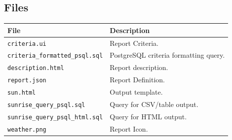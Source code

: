 \documentclass[a4paper,10pt]{book}
\newcommand{\partnumber}{\ifthenelse{\isundefined{\projectnum}}{}{\projectnum-\docnum	\ifthenelse{\equal{\docrev}{001}}{}{.\docrev}}}
\newcommand*\cleartoleftpage{%
  \clearpage
  \ifodd\value{page}\hbox{}\newpage\fi
}
\begin{document}
\subsection{Files}
\begin{tabular}{p{5.8cm} l}
\hline
\textbf{File} & \textbf{Description} \\
\hline
\verb|criteria.ui| & Report Criteria.\\
\verb|criteria_formatted_psql.sql| & PostgreSQL criteria formatting query. \\
\verb|description.html| & Report description. \\
\verb|report.json| & Report Definition.\\
\verb|sun.html| & Output template.\\
\verb|sunrise_query_psql.sql| & Query for CSV/table output.\\
\verb|sunrise_query_psql_html.sql| & Query for HTML output. \\
\verb|weather.png| & Report Icon.\\
\hline
\end{tabular}



\cleartoleftpage
\thispagestyle{empty}
\begin{flushright}
\null
\vfill
\tt \partnumber
\end{flushright}
\end{document}
